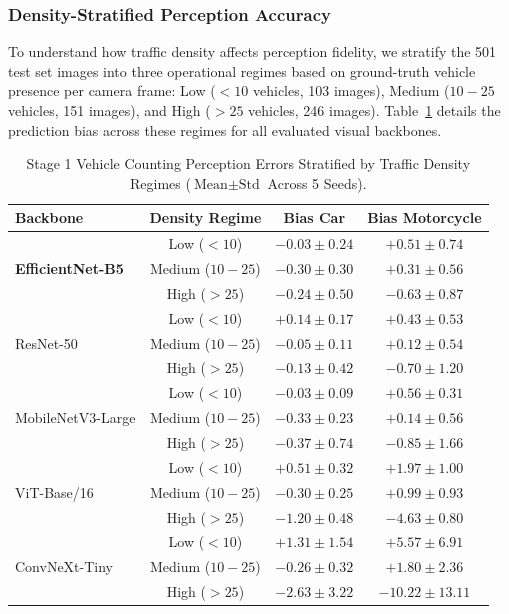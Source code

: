 \documentclass[a4paper,fleqn]{cas-sc}
\begin{document}
\subsubsection{Density-Stratified Perception Accuracy}
To understand how traffic density affects perception fidelity, we stratify the 501 test set images into three operational regimes based on ground-truth vehicle presence per camera frame: Low ($<10$ vehicles, 103 images), Medium ($10-25$ vehicles, 151 images), and High ($>25$ vehicles, 246 images). Table~\ref{tab:stage1_density} details the prediction bias across these regimes for all evaluated visual backbones.

\begin{table}[pos=htbp]
\centering
\footnotesize
\setlength{\tabcolsep}{4pt}
\renewcommand{\arraystretch}{1.1}
\caption{Stage 1 Vehicle Counting Perception Errors Stratified by Traffic Density Regimes ($\text{Mean} \pm \text{Std}$ Across 5 Seeds).}
\label{tab:stage1_density}
\begin{tabular}{lccc}
\toprule
\textbf{Backbone} & \textbf{Density Regime} & \textbf{Bias Car} & \textbf{Bias Motorcycle} \\
\midrule
\multirow{3}{*}{\textbf{EfficientNet-B5}} & Low ($<10$) & $-0.03 \pm 0.24$ & $+0.51 \pm 0.74$ \\
 & Medium ($10-25$) & $-0.30 \pm 0.30$ & $+0.31 \pm 0.56$ \\
 & High ($>25$) & $-0.24 \pm 0.50$ & $-0.63 \pm 0.87$ \\
\midrule
\multirow{3}{*}{ResNet-50} & Low ($<10$) & $+0.14 \pm 0.17$ & $+0.43 \pm 0.53$ \\
 & Medium ($10-25$) & $-0.05 \pm 0.11$ & $+0.12 \pm 0.54$ \\
 & High ($>25$) & $-0.13 \pm 0.42$ & $-0.70 \pm 1.20$ \\
\midrule
\multirow{3}{*}{MobileNetV3-Large} & Low ($<10$) & $-0.03 \pm 0.09$ & $+0.56 \pm 0.31$ \\
 & Medium ($10-25$) & $-0.33 \pm 0.23$ & $+0.14 \pm 0.56$ \\
 & High ($>25$) & $-0.37 \pm 0.74$ & $-0.85 \pm 1.66$ \\
\midrule
\multirow{3}{*}{ViT-Base/16} & Low ($<10$) & $+0.51 \pm 0.32$ & $+1.97 \pm 1.00$ \\
 & Medium ($10-25$) & $-0.30 \pm 0.25$ & $+0.99 \pm 0.93$ \\
 & High ($>25$) & $-1.20 \pm 0.48$ & $-4.63 \pm 0.80$ \\
\midrule
\multirow{3}{*}{ConvNeXt-Tiny} & Low ($<10$) & $+1.31 \pm 1.54$ & $+5.57 \pm 6.91$ \\
 & Medium ($10-25$) & $-0.26 \pm 0.32$ & $+1.80 \pm 2.36$ \\
 & High ($>25$) & $-2.63 \pm 3.22$ & $-10.22 \pm 13.11$ \\
\bottomrule
\end{tabular}%
\end{table}
\end{document}
